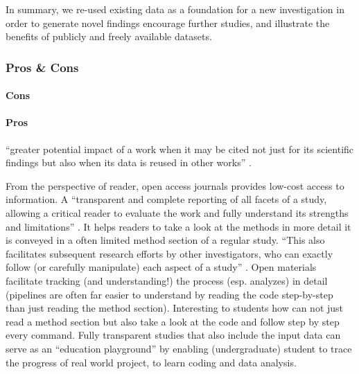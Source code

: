 In summary, we re-used existing data as a foundation for a new investigation in
order to generate novel findings encourage further studies, and illustrate the
benefits of publicly and freely available datasets.



\subsubsection{Pros \& Cons}


\paragraph{Cons}



\paragraph{Pros}





``greater potential impact of a work when it may be cited not just for its
scientific findings but also when its data is reused in other works''
\citep{nichols2017best}.



%
From the perspective of reader, open access journals provides low-cost access to
information.
A ``transparent and complete reporting of all facets of a study, allowing a
critical reader to evaluate the work and fully understand its strengths and
limitations'' \citep{nichols2017best}.
%
It helps readers to take a look at the methods in more detail it is conveyed in
a often limited method section of a regular study.
%
``This also facilitates subsequent research efforts by other investigators, who
can exactly follow (or carefully manipulate) each aspect of a study''
\citep{nichols2017best}.
%
Open materials facilitate tracking (and understanding!) the process (esp.
analyzes) in detail (pipelines are often far easier to understand by reading the
code step-by-step than just reading the method section).
%
Interesting to students how can not just read a method section but also take a
look at the code and follow step by step every command.
%
Fully transparent studies that also include the input data can serve as an
``education playground'' by enabling (undergraduate) student to trace the
progress of real world project, to learn coding and data analysis.


